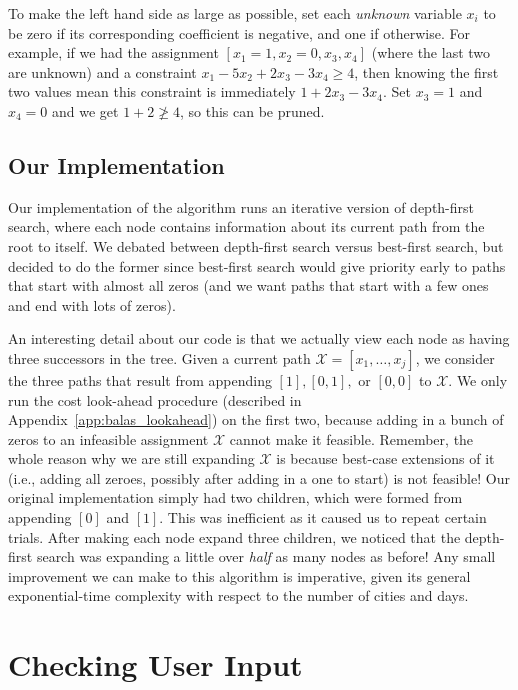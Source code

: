 \documentclass{article}
\begin{document}
To make the left hand side as large as possible, set each \emph{unknown} variable $x_i$ to be zero if its corresponding coefficient is negative, and
one if otherwise. For example, if we had the assignment $[x_1=1, x_2=0, x_3, x_4]$ (where the last two are unknown) and a constraint $x_1 - 5x_2 +
2x_3 -3x_4 \ge 4$, then knowing the first two values mean this constraint is immediately $1 + 2x_3 - 3x_4$. Set $x_3=1$ and $x_4=0$ and we get $1+2
\not \ge 4$, so this can be pruned.

\subsection{Our Implementation}

Our implementation of the algorithm runs an iterative version of depth-first search, where each node contains information about its current path from
the root to itself. We debated between depth-first search versus best-first search, but decided to do the former since best-first search would give
priority early to paths that start with almost all zeros (and we want paths that start with a few ones and end with lots of zeros).

An interesting detail about our code is that we actually view each node as having three successors in the tree. Given a current path $\mathcal{X} =
[x_1, \ldots, x_j]$, we consider the three paths that result from appending $[1],[0,1],$ or $[0,0]$ to $\mathcal{X}$. We only run the cost look-ahead
procedure (described in Appendix~\ref{app:balas_lookahead}) on the first two, because adding in a bunch of zeros to an infeasible assignment
$\mathcal{X}$ cannot make it feasible. Remember, the whole reason why we are still expanding $\mathcal{X}$ is because best-case extensions of it
(i.e., adding all zeroes, possibly after adding in a one to start) is not feasible! Our original implementation simply had two children, which were
formed from appending $[0]$ and $[1]$. This was inefficient as it caused us to repeat certain trials. After making each node expand three children, we
noticed that the depth-first search was expanding a little over \emph{half} as many nodes as before! Any small improvement we can make to this
algorithm is imperative, given its general exponential-time complexity with respect to the number of cities and days.

\newpage
\section{Checking User Input}\label{app:input_check}
\end{document}
